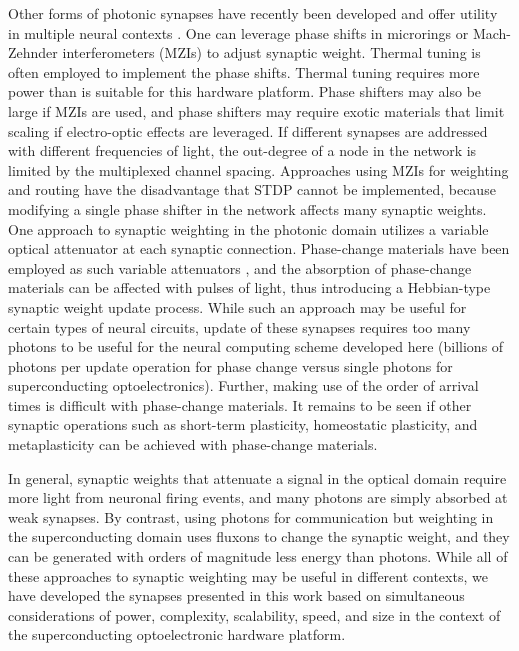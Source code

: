 \documentclass[aip,amsmath,amssymb,reprint,nofootinbib]{revtex4-1}
\begin{document}
Other forms of photonic synapses have recently been developed and offer utility in multiple neural contexts \cite{prsh2017,tana20142,tafe2017,shha2016,chri2017,humi2018}. One can leverage phase shifts in microrings \cite{tana20142,tafe2017} or Mach-Zehnder interferometers (MZIs) \cite{shha2016} to adjust synaptic weight. Thermal tuning is often employed to implement the phase shifts. Thermal tuning requires more power than is suitable for this hardware platform. Phase shifters may also be large if MZIs are used, and phase shifters may require exotic materials that limit scaling if electro-optic effects are leveraged. If different synapses are addressed with different frequencies of light, the out-degree of a node in the network is limited by the multiplexed channel spacing. Approaches using MZIs for weighting and routing have the disadvantage that STDP cannot be implemented, because modifying a single phase shifter in the network affects many synaptic weights. One approach to synaptic weighting in the photonic domain utilizes a variable optical attenuator at each synaptic connection. Phase-change materials have been employed as such variable attenuators \cite{chri2017}, and the absorption of phase-change materials can be affected with pulses of light, thus introducing a Hebbian-type synaptic weight update process. While such an approach may be useful for certain types of neural circuits, update of these synapses requires too many photons to be useful for the neural computing scheme developed here (billions of photons per update operation for phase change versus single photons for superconducting optoelectronics). Further, making use of the order of arrival times is difficult with phase-change materials. It remains to be seen if other synaptic operations such as short-term plasticity, homeostatic plasticity, and metaplasticity can be achieved with phase-change materials. 

In general, synaptic weights that attenuate a signal in the optical domain require more light from neuronal firing events, and many photons are simply absorbed at weak synapses. By contrast, using photons for communication but weighting in the superconducting domain uses fluxons to change the synaptic weight, and they can be generated with orders of magnitude less energy than photons. While all of these approaches to synaptic weighting may be useful in different contexts, we have developed the synapses presented in this work based on simultaneous considerations of power, complexity, scalability, speed, and size in the context of the superconducting optoelectronic hardware platform.
\end{document}
